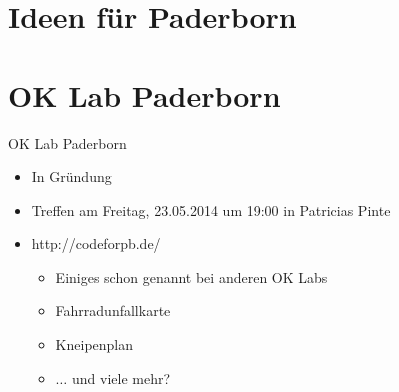 \section{Ideen für Paderborn}

\section{OK Lab Paderborn}
\begin{frame}{OK Lab Paderborn}
 \begin{itemize}
  \item In Gründung
  \item Treffen am Freitag, 23.05.2014 um 19:00 in Patricias Pinte
  \item http://codeforpb.de/
  \begin{itemize}
   \item Einiges schon genannt bei anderen OK Labs
   \item Fahrradunfallkarte
   \item Kneipenplan
   \item $\dots$ und viele mehr?
  \end{itemize}
 \end{itemize}
\end{frame}

